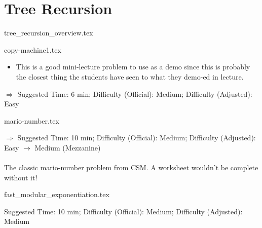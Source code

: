 \documentclass{exam}
\begin{document}
\section{Tree Recursion}
{tree_recursion_overview.tex}
\begin{questions}
    {copy-machine1.tex}
    \begin{questionmeta}
        \begin{itemize}
            \item This is a good mini-lecture problem to use as a demo since this is probably the closest thing the students have seen to what they demo-ed in lecture.
        \end{itemize}
        $\Rightarrow$ Suggested Time: 6 min; Difficulty (Official): Medium; Difficulty (Adjusted): Easy
    \end{questionmeta}
    \newpage
    {mario-number.tex}
    \begin{questionmeta}
        $\Rightarrow$ Suggested Time: 10 min; Difficulty (Official): Medium; Difficulty (Adjusted): Easy $\rightarrow$ Medium (Mezzanine) \\ \\
        The classic mario-number problem from CSM. A worksheet wouldn't be complete without it!
    \end{questionmeta}
    \newpage
    {fast_modular_exponentiation.tex}
    \begin{questionmeta}
        Suggested Time: 10 min; Difficulty (Official): Medium; Difficulty (Adjusted): Medium
    \end{questionmeta}

\end{questions}
\end{document}
